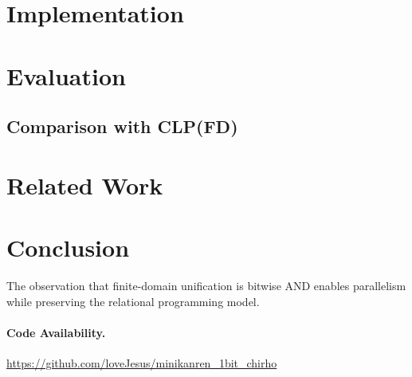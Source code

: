 \documentclass[11pt,a4paper]{article}
\begin{document}
\section{Implementation}


\section{Evaluation}


\subsection{Comparison with CLP(FD)}

\section{Related Work}


\section{Conclusion}

The observation that finite-domain unification is bitwise AND enables
parallelism while preserving the relational programming model.

\paragraph{Code Availability.}
\url{https://github.com/loveJesus/minikanren_1bit_chirho}
\end{document}
